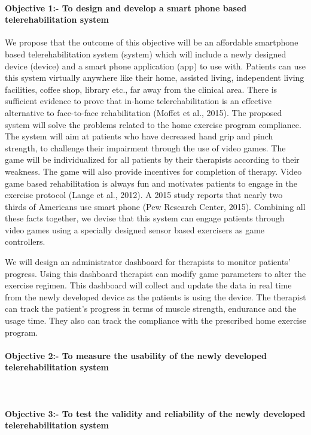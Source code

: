 \documentclass[12pt]{article}
\begin{document}
\paragraph{Objective 1:- To design and develop a smart phone based telerehabilitation system } 

We propose that the outcome of this objective will be an affordable smartphone based telerehabilitation system (system) which will include a newly designed device (device) and a smart phone application (app) to use  with.  Patients can use this system virtually anywhere like their home, assisted living, independent living facilities, coffee shop, library etc., far away from the clinical area. There is sufficient evidence to prove that in-home telerehabilitation is an effective alternative to face-to-face rehabilitation (Moffet et al., 2015). The proposed system will solve the problems related to the  home exercise program compliance. The system will aim at patients who have decreased hand grip and pinch strength, to challenge their impairment through the use of video games. The game will be individualized for all patients by their therapists according to their weakness.  The game will also provide incentives for completion of therapy. Video game based rehabilitation is always fun and motivates patients to engage in the exercise protocol (Lange et al., 2012). A 2015 study reports that nearly two thirds of Americans use smart phone (Pew Research Center, 2015). Combining all these facts together, we devise that this system can engage patients through video games using a specially designed sensor based exercisers as game controllers. 

We will design an administrator dashboard for therapists to monitor patients' progress. Using this dashboard therapist can modify game parameters to alter the exercise regimen. This dashboard will collect and update the data  in real time from the newly developed device as the patients is using the device. The therapist can track the patient's progress in terms of muscle strength, endurance and the usage time. They also can track  the compliance with the prescribed home exercise program.  

\paragraph{Objective 2:- To measure the usability of the newly developed telerehabilitation system}~\\

\paragraph{Objective 3:- To test the validity and reliability of the newly developed telerehabilitation system}~\\
\end{document}
